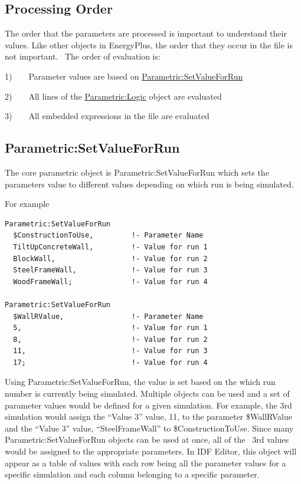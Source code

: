 \subsection{Processing Order}\label{processing-order}

The order that the parameters are processed is important to understand their values. Like other objects in EnergyPlus, the order that they occur in the file is not important.~ The order of evaluation is:

1)~~~~Parameter values are based on \hyperref[parametricsetvalueforrun]{Parametric:SetValueForRun}

2)~~~~All lines of the \hyperref[parametriclogic]{Parametric:Logic} object are evaluated

3)~~~~All embedded expressions in the file are evaluated

\subsection{Parametric:SetValueForRun}\label{parametricsetvalueforrun}

The core parametric object is Parametric:SetValueForRun which sets the parameters value to different values depending on which run is being simulated.

For example

\begin{lstlisting}
Parametric:SetValueForRun
  $ConstructionToUse,         !- Parameter Name
  TiltUpConcreteWall,         !- Value for run 1
  BlockWall,                  !- Value for run 2
  SteelFrameWall,             !- Value for run 3
  WoodFrameWall;              !- Value for run 4

Parametric:SetValueForRun
  $WallRValue,                !- Parameter Name
  5,                          !- Value for run 1
  8,                          !- Value for run 2
  11,                         !- Value for run 3
  17;                         !- Value for run 4
\end{lstlisting}

Using Parametric:SetValueForRun, the value is set based on the which run number is currently being simulated. Multiple objects can be used and a set of parameter values would be defined for a given simulation. For example, the 3rd simulation would assign the ``Value 3'' value, 11, to the parameter \$WallRValue and the ``Value 3'' value, ``SteelFrameWall'' to \$ConstructionToUse. Since many Parametric:SetValueForRun objects can be used at once, all of the~ 3rd values would be assigned to the appropriate parameters. In IDF Editor, this object will appear as a table of values with each row being all the parameter values for a specific simulation and each column belonging to a specific parameter.

